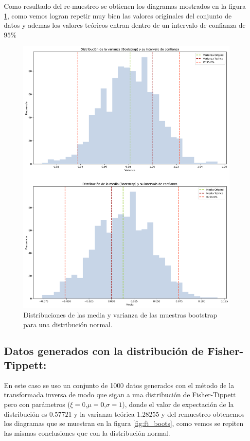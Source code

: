 \documentclass[baaa]{baaa}
\begin{document}
Como resultado del re-muestreo se obtienen los diagramas mostrados en la figura \ref{fig:norm_boots}, como vemos logran repetir muy bien las valores originales del conjunto de datos y ademas los valores teóricos entran dentro de un intervalo de confianza de $95\%$

\begin{figure}[h]
    \centering
    \includegraphics[width=\linewidth]{imagenes/bootstrap.png}
    \caption{Distribuciones de las media y varianza de las muestras bootstrap para una distribución normal.}
    \label{fig:norm_boots}
\end{figure}

\subsection{Datos generados con la distribución de Fisher-Tippett:} 
En este caso se uso un conjunto de 1000 datos generados con el método de la transformada inversa de modo que sigan a una distribución de Fisher-Tippett pero con parámetros ($\xi=0$,$\mu=0$,$\sigma=1$), donde el valor de expectación de la distribución es $0.57721$ y la varianza teórica $1.28255$ y del remuestreo obtenemos los diagramas que se muestran en la figura \ref{fig:ft_boots}, como vemos se repiten las mismas conclusiones que con la distribución normal.
\end{document}
